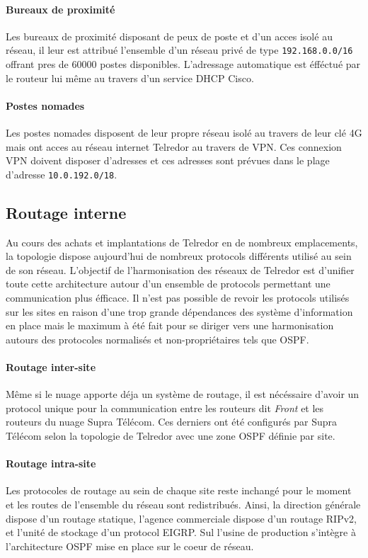 \documentclass{article}
\newcommand{\tlr}{Telredor\xspace}
\newcommand{\spr}{Supra Télécom\xspace}
\begin{document}
\paragraph{Bureaux de proximité} Les bureaux de proximité disposant de peux de poste et d'un acces isolé au réseau, il leur est attribué l'ensemble d'un réseau privé de type \texttt{192.168.0.0/16} offrant pres de 60000 postes disponibles.
L'adressage automatique est éfféctué par le routeur lui même au travers d'un service DHCP Cisco.

\paragraph{Postes nomades} Les postes nomades disposent de leur propre réseau isolé au travers de leur clé 4G mais ont acces au réseau internet \tlr au travers de VPN.
Ces connexion VPN doivent disposer d'adresses et ces adresses sont prévues dans le plage d'adresse \texttt{10.0.192.0/18}.

\subsection{Routage interne}

Au cours des achats et implantations de \tlr en de nombreux emplacements, la topologie dispose aujourd'hui de nombreux protocols différents utilisé au sein de son réseau.
L'objectif de l'harmonisation des réseaux de \tlr est d'unifier toute cette architecture autour d'un ensemble de protocols permettant une communication plus éfficace.
Il n'est pas possible de revoir les protocols utilisés sur les sites en raison d'une trop grande dépendances des système d'information en place mais le maximum à été fait pour se diriger vers une harmonisation autours des protocoles normalisés et non-propriétaires tels que OSPF.

\paragraph{Routage inter-site} Même si le nuage apporte déja un système de routage, il est nécéssaire d'avoir un protocol unique pour la communication entre les routeurs dit \emph{Front} et les routeurs du nuage \spr.
Ces derniers ont été configurés par \spr selon la topologie de \tlr avec une zone OSPF définie par site.

\paragraph{Routage intra-site} Les protocoles de routage au sein de chaque site reste inchangé pour le moment et les routes de l'ensemble du réseau sont redistribués.
Ainsi, la direction générale dispose d'un routage statique, l'agence commerciale dispose d'un routage RIPv2, et l'unité de stockage d'un protocol EIGRP.
Sul l'usine de production s'intègre à l'architecture OSPF mise en place sur le coeur de réseau.
\end{document}
